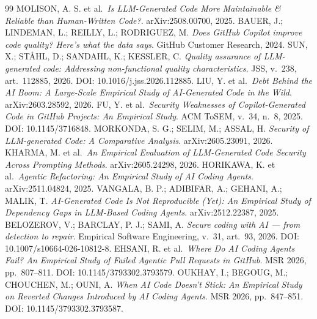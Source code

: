 \documentclass[sigconf,anonymous]{acmart}
\begin{document}
\begin{thebibliography}{99}
 MOLISON, A. S. et al.\ \emph{Is LLM-Generated Code More Maintainable \& Reliable than Human-Written Code?}. arXiv:2508.00700, 2025.
 BAUER, J.; LINDEMAN, L.; REILLY, L.; RODRIGUEZ, M. \emph{Does GitHub Copilot improve code quality? Here's what the data says}. GitHub Customer Research, 2024.
 SUN, X.; ST\AA{}HL, D.; SANDAHL, K.; KESSLER, C. \emph{Quality assurance of LLM-generated code: Addressing non-functional quality characteristics}. JSS, v.~238, art.~112885, 2026. DOI: 10.1016/j.jss.2026.112885.
 LIU, Y. et al.\ \emph{Debt Behind the AI Boom: A Large-Scale Empirical Study of AI-Generated Code in the Wild}. arXiv:2603.28592, 2026.
 FU, Y. et al.\ \emph{Security Weaknesses of Copilot-Generated Code in GitHub Projects: An Empirical Study}. ACM ToSEM, v.~34, n.~8, 2025. DOI: 10.1145/3716848.
 MORKONDA, S. G.; SELIM, M.; ASSAL, H. \emph{Security of LLM-generated Code: A Comparative Analysis}. arXiv:2605.23091, 2026.
 KHARMA, M. et al.\ \emph{An Empirical Evaluation of LLM-Generated Code Security Across Prompting Methods}. arXiv:2605.24298, 2026.
 HORIKAWA, K. et al.\ \emph{Agentic Refactoring: An Empirical Study of AI Coding Agents}. arXiv:2511.04824, 2025.
 VANGALA, B. P.; ADIBIFAR, A.; GEHANI, A.; MALIK, T. \emph{AI-Generated Code Is Not Reproducible (Yet): An Empirical Study of Dependency Gaps in LLM-Based Coding Agents}. arXiv:2512.22387, 2025.
 BELOZEROV, V.; BARCLAY, P. J.; SAMI, A. \emph{Secure coding with AI --- from detection to repair}. Empirical Software Engineering, v.~31, art.~93, 2026. DOI: 10.1007/s10664-026-10812-8.
 EHSANI, R. et al.\ \emph{Where Do AI Coding Agents Fail? An Empirical Study of Failed Agentic Pull Requests in GitHub}. MSR 2026, pp.~807--811. DOI: 10.1145/3793302.3793579.
 OUKHAY, I.; BEGOUG, M.; CHOUCHEN, M.; OUNI, A. \emph{When AI Code Doesn't Stick: An Empirical Study on Reverted Changes Introduced by AI Coding Agents}. MSR 2026, pp.~847--851. DOI: 10.1145/3793302.3793587.

\end{thebibliography}
\end{document}
